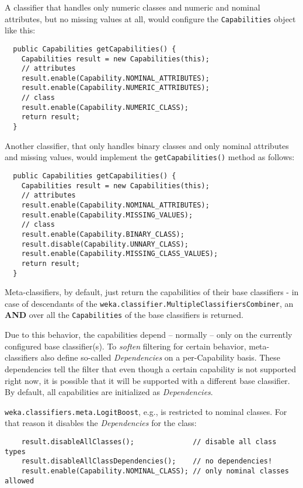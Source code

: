 \newpage
{}
A classifier that handles only numeric classes and numeric and nominal
attributes, but no missing values at all, would configure the
\texttt{Capabilities} object like this:
\begin{verbatim}
  public Capabilities getCapabilities() {
    Capabilities result = new Capabilities(this);
    // attributes
    result.enable(Capability.NOMINAL_ATTRIBUTES);
    result.enable(Capability.NUMERIC_ATTRIBUTES);
    // class
    result.enable(Capability.NUMERIC_CLASS);
    return result;
  }
\end{verbatim}
Another classifier, that only handles binary classes and only nominal
attributes and missing values, would implement the \texttt{getCapabilities()}
method as follows:
\begin{verbatim}
  public Capabilities getCapabilities() {
    Capabilities result = new Capabilities(this);
    // attributes
    result.enable(Capability.NOMINAL_ATTRIBUTES);
    result.enable(Capability.MISSING_VALUES);
    // class
    result.enable(Capability.BINARY_CLASS);
    result.disable(Capability.UNNARY_CLASS);
    result.enable(Capability.MISSING_CLASS_VALUES);
    return result;
  }
\end{verbatim}

Meta-classifiers, by default, just return the capabilities of their base
classifiers - in case of descendants of the
\texttt{weka.classifier.MultipleClassifiersCombiner}, an \textbf{AND} over all
the \texttt{Capabilities} of the base classifiers is returned.

Due to this behavior, the capabilities depend -- normally -- only on the
currently configured base classifier(s). To \textit{soften} filtering for
certain behavior, meta-classifiers also define so-called \textit{Dependencies}
on a per-Capability basis. These dependencies tell the filter that even though a
certain capability is not supported right now, it is possible that it will be
supported with a different base classifier. By default, all
capabilities are initialized as \textit{Dependencies}.

\texttt{weka.classifiers.meta.LogitBoost}, e.g., is restricted to nominal
classes. For that reason it disables the \textit{Dependencies} for the class:
{\small \begin{verbatim}
    result.disableAllClasses();              // disable all class types
    result.disableAllClassDependencies();    // no dependencies!
    result.enable(Capability.NOMINAL_CLASS); // only nominal classes allowed
\end{verbatim}}

